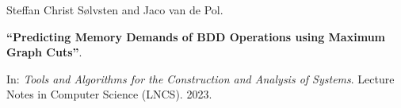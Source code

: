 Steffan Christ Sølvsten and Jaco van de Pol.

{\bf ``Predicting Memory Demands of BDD Operations using Maximum Graph Cuts''}.

In: \emph{Tools and Algorithms for the Construction and Analysis of Systems}.
Lecture Notes in Computer Science (LNCS). 2023.

\label{cite:2023.tacas}